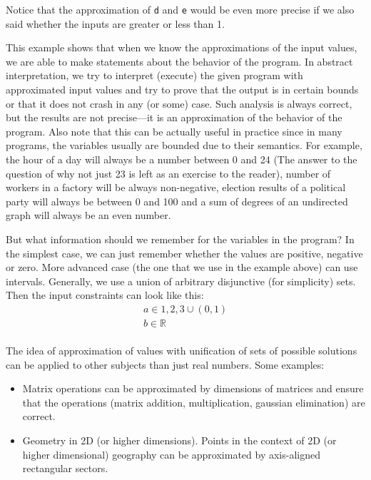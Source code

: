 Notice that the approximation of \verb|d| and \verb|e| would be even more precise if we also said whether the inputs
are greater or less than 1.

This example shows that when we know the approximations of the input values, we are able to make statements about the
behavior of the program.
In abstract interpretation, we try to interpret (execute) the given program with approximated input values and try to
prove that the output is in certain bounds or that it does not crash in any (or some) case.
Such analysis is always correct, but the results are not precise---it is an approximation of the behavior of the program.
Also note that this can be actually useful in practice since in many programs, the variables usually are bounded due to
their semantics.
For example, the hour of a day will always be a number between 0 and 24 (The answer to the question of why not just 23 is
left as an exercise to the reader),
number of workers in a factory will be always non-negative, election results of a political party will always be
between 0 and 100 and a sum of degrees of an undirected graph will always be an even number.

But what information should we remember for the variables in the program?
In the simplest case, we can just remember whether the values are positive, negative or zero.
More advanced case (the one that we use in the example above) can use intervals.
Generally, we use a union of arbitrary disjunctive (for simplicity) sets.
Then the input constraints can look like this:
\begin{gather*}
    a \in {1, 2, 3} \cup (0, 1)\\
    b \in \mathbb{R}\\
\end{gather*}

The idea of approximation of values with unification of sets of possible solutions can be applied to other subjects than
just real numbers.
Some examples:
\begin{itemize}
    \item Matrix operations can be approximated by dimensions of matrices and ensure that the operations
    (matrix addition, multiplication, gaussian elimination) are correct.

    \item Geometry in 2D (or higher dimensions).
    Points in the context of 2D (or higher dimensional) geography can be approximated by axis-aligned rectangular sectors.
\end{itemize}

